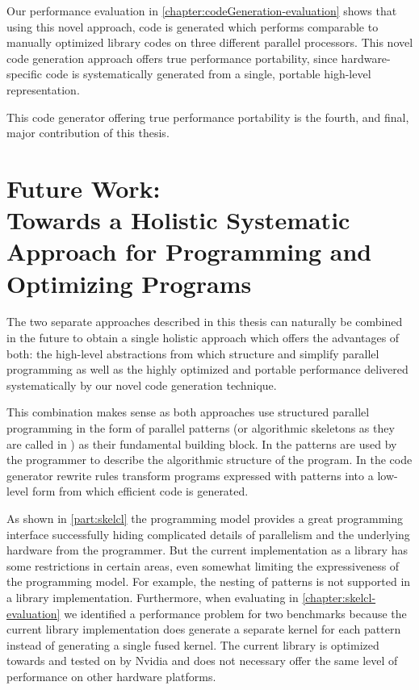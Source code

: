 Our performance evaluation in \autoref{chapter:codeGeneration-evaluation} shows that using this novel approach, \OpenCL code is generated which performs comparable to manually optimized library codes on three different parallel processors.
This novel code generation approach offers true performance portability, since hardware-specific code is systematically generated from a single, portable high-level representation.

\bigskip
This code generator offering true performance portability is the fourth, and final, major contribution of this thesis.


\section[Future Work]{Future Work:\\ Towards a Holistic Systematic Approach for Programming and Optimizing Programs}
\label{section:future-work}
The two separate approaches described in this thesis can naturally be combined in the future to obtain a single holistic approach which offers the advantages of both:
the high-level abstractions from \SkelCL which structure and simplify parallel programming as well as the highly optimized and portable performance delivered systematically by our novel code generation technique.

This combination makes sense as both approaches use structured parallel programming in the form of parallel patterns (or algorithmic skeletons as they are called in \SkelCL) as their fundamental building block.
In \SkelCL the patterns are used by the programmer to describe the algorithmic structure of the program.
In the code generator rewrite rules transform programs expressed with patterns into a low-level form from which efficient \OpenCL code is generated.

As shown in \autoref{part:skelcl} the \SkelCL programming model provides a great programming interface successfully hiding complicated details of parallelism and the underlying hardware from the programmer.
But the current implementation as a \Cpp library has some restrictions in certain areas, even somewhat limiting the expressiveness of the programming model.
For example, the nesting of patterns is not supported in a library implementation.
Furthermore, when evaluating \SkelCL in \autoref{chapter:skelcl-evaluation} we identified a performance problem for two benchmarks because the current \SkelCL library implementation does generate a separate \OpenCL kernel for each pattern instead of generating a single fused kernel.
The current library is optimized towards and tested on \GPUs by Nvidia and does not necessary offer the same level of performance on other hardware platforms.

